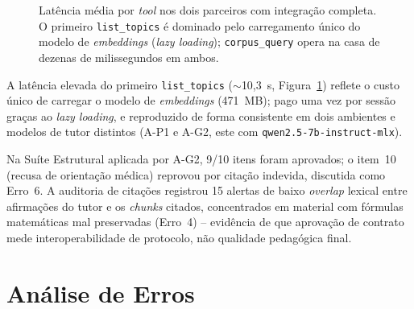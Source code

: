 \documentclass[12pt]{article}
\begin{document}
\begin{figure}[h]
\centering
{}
\caption{Latência média por \textit{tool} nos dois parceiros com integração completa. O primeiro
\texttt{list\_topics} é dominado pelo carregamento único do modelo de \textit{embeddings}
(\textit{lazy loading}); \texttt{corpus\_query} opera na casa de dezenas de milissegundos em
ambos.}
\label{fig:latencia}
\end{figure}

A latência elevada do primeiro \texttt{list\_topics} ($\sim$10,3~s, Figura~\ref{fig:latencia})
reflete o custo único de carregar o modelo de \textit{embeddings} (471~MB); pago uma vez por
sessão graças ao \textit{lazy loading}, e reproduzido de forma consistente em dois ambientes e
modelos de tutor distintos (A-P1 e A-G2, este com \texttt{qwen2.5-7b-instruct-mlx}).

Na Suíte Estrutural aplicada por A-G2, 9/10 itens foram aprovados; o item~10 (recusa de orientação
médica) reprovou por citação indevida, discutida como Erro~6. A auditoria de citações registrou 15
alertas de baixo \textit{overlap} lexical entre afirmações do tutor e os \textit{chunks} citados,
concentrados em material com fórmulas matemáticas mal preservadas (Erro~4) -- evidência de que
aprovação de contrato mede interoperabilidade de protocolo, não qualidade pedagógica final.

\section{Análise de Erros}
\label{sec:erros}
\end{document}
